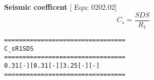 \documentclass[12pt,notitle,letterpaper]{report}
\renewenvironment{quote}
  {\small\list{}{\rightmargin=0cm \leftmargin=0cm}%
   \item\relax}
  {\endlist}
\begin{document}
\textbf{Seismic coefficent} \hfill {[} Equ: 0202.02{]}
%
\begin{equation*}
C_{s} = \frac{SDS}{R_{1}}
\end{equation*}
\begin{quote}
\begin{alltt}
====================  ========  =====
        C_s              R1      SDS
====================  ========  =====
0.31 [-]  [0.31 [-]]  3.25 [-]   [-]
====================  ========  =====
\end{alltt}
\end{quote}
\end{document}
